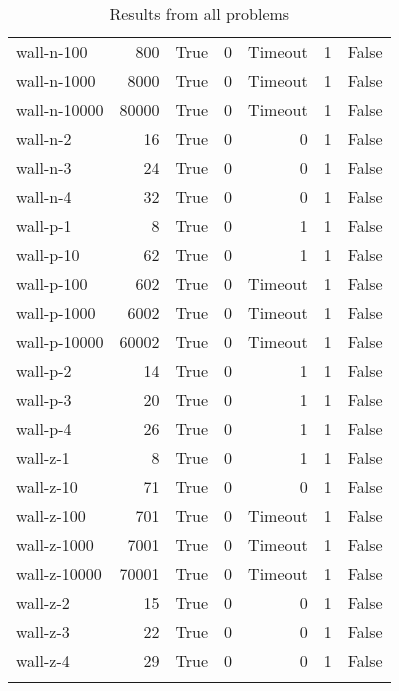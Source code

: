 \begin{longtable}{lrlrrrl}
wall-n-100 & 800 & True & 0 & Timeout & 1 & False \\
wall-n-1000 & 8000 & True & 0 & Timeout & 1 & False \\
wall-n-10000 & 80000 & True & 0 & Timeout & 1 & False \\
wall-n-2 & 16 & True & 0 & 0 & 1 & False \\
wall-n-3 & 24 & True & 0 & 0 & 1 & False \\
wall-n-4 & 32 & True & 0 & 0 & 1 & False \\
wall-p-1 & 8 & True & 0 & 1 & 1 & False \\
wall-p-10 & 62 & True & 0 & 1 & 1 & False \\
wall-p-100 & 602 & True & 0 & Timeout & 1 & False \\
wall-p-1000 & 6002 & True & 0 & Timeout & 1 & False \\
wall-p-10000 & 60002 & True & 0 & Timeout & 1 & False \\
wall-p-2 & 14 & True & 0 & 1 & 1 & False \\
wall-p-3 & 20 & True & 0 & 1 & 1 & False \\
wall-p-4 & 26 & True & 0 & 1 & 1 & False \\
wall-z-1 & 8 & True & 0 & 1 & 1 & False \\
wall-z-10 & 71 & True & 0 & 0 & 1 & False \\
wall-z-100 & 701 & True & 0 & Timeout & 1 & False \\
wall-z-1000 & 7001 & True & 0 & Timeout & 1 & False \\
wall-z-10000 & 70001 & True & 0 & Timeout & 1 & False \\
wall-z-2 & 15 & True & 0 & 0 & 1 & False \\
wall-z-3 & 22 & True & 0 & 0 & 1 & False \\
wall-z-4 & 29 & True & 0 & 0 & 1 & False \\
\caption{Results from all problems}\label{table:results}
\end{longtable}